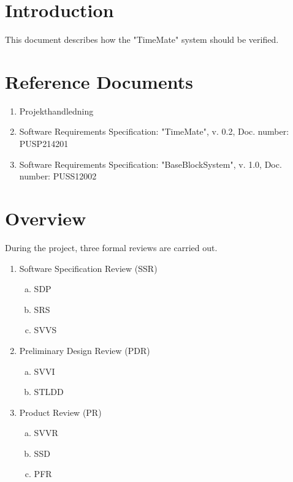 \documentclass{article}
\date {#1}
\title {
    \documentNumber {02}    
    
    \documentVersion {0.2}
    
    \documentTitle {Software Verification and Validation Specification}
    \documentGroup {2}
    
    \documentResponsible {Test Group (TG)}
    \documentAuthors {Test Group (TG)}
    
    \documentDate {2021-02-02}
}
\begin{document}
\maketitle
\thispagestyle{empty}

\newpage

\tableofcontents

\newpage


\section{Introduction}

	This document describes how the "TimeMate" system should be verified. 

\section{Reference Documents}

\begin{enumerate}
  \item Projekthandledning 
  \item Software Requirements Specification: "TimeMate", v. 0.2, Doc. number: PUSP214201
  \item Software Requirements Specification: "BaseBlockSystem", v. 1.0, Doc. number: PUSS12002

\end{enumerate}

\section{Overview}
During the project, three formal reviews are carried out.


\begin{enumerate}
	\item Software Specification Review (SSR)
		\begin{enumerate}[a.] 
			\item SDP
			\item SRS 
			\item SVVS 
		\end{enumerate}
	\item Preliminary Design Review (PDR) 
		\begin{enumerate}[a.]
			\item SVVI
			\item STLDD
		\end{enumerate}
	\item Product Review (PR) 
		\begin{enumerate}[a.]
			\item SVVR 
			\item SSD 
			\item PFR 
		\end{enumerate}
\end{enumerate}
\end{document}
